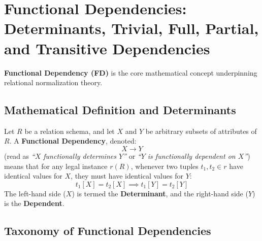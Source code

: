 \newpage
\section{Functional Dependencies: Determinants, Trivial, Full, Partial, and Transitive Dependencies}

\textbf{Functional Dependency (FD)} is the core mathematical concept underpinning relational normalization theory.

\subsection{Mathematical Definition and Determinants}

Let $R$ be a relation schema, and let $X$ and $Y$ be arbitrary subsets of attributes of $R$. A \textbf{Functional Dependency}, denoted:
\[ X \rightarrow Y \]
(read as \textit{``$X$ functionally determines $Y$''} or \textit{``$Y$ is functionally dependent on $X$''}) means that for any legal instance $r(R)$, whenever two tuples $t_1, t_2 \in r$ have identical values for $X$, they must have identical values for $Y$:
\[ t_1[X] = t_2[X] \implies t_1[Y] = t_2[Y] \]
The left-hand side ($X$) is termed the \textbf{Determinant}, and the right-hand side ($Y$) is the \textbf{Dependent}.

\subsection{Taxonomy of Functional Dependencies}

